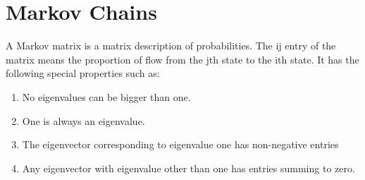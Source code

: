 \documentclass[11pt]{article}
\begin{document}
\section{Markov Chains}
A Markov matrix is a matrix description of probabilities. The ij entry of the matrix means the proportion of flow from the jth state to the ith state. It has the following special properties such as:

\begin{enumerate}
    \item No eigenvalues can be bigger than one.
    \item One is always an eigenvalue.
    \item The eigenvector corresponding to eigenvalue one has non-negative entries
    \item Any eigenvector with eigenvalue other than one has entries summing to zero.
\end{enumerate}
\end{document}
